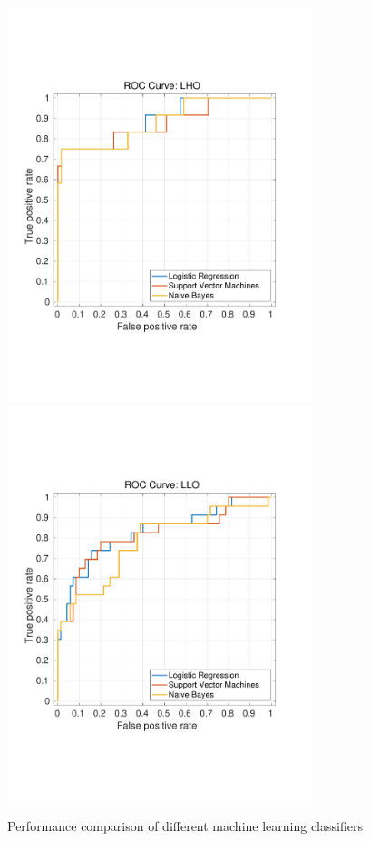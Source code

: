 \documentclass[reprint, prl, aps, showpacs]{revtex4-1}
\begin{document}
	
\begin{figure}[t]
\hspace*{-0.5cm}
 \includegraphics[width=3.5in, trim = 0 4.5cm 0 4.5cm, clip=true]{lho_lockloss_ROC.pdf}
  \includegraphics[width=3.5in, trim = 0 4.5cm 0 4.5cm, clip=true]{llo_lockloss_ROC.pdf}
 \caption{Performance comparison of different machine learning classifiers}
 \label{fig:MLA_comparison}
\end{figure}
\end{document}

